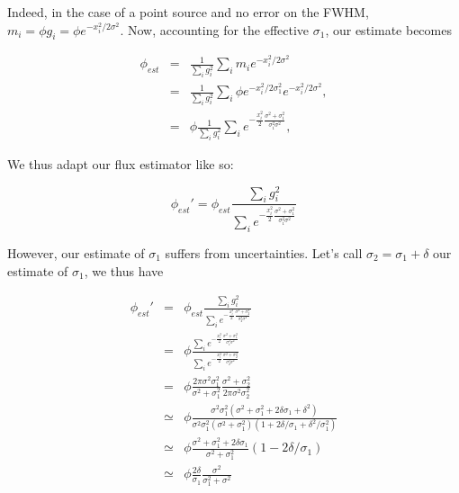 Indeed, in the case of a point source and no error on the FWHM, $m_i = \phi
g_i = \phi e^{-x_i^2/2\sigma^2}$. Now, accounting for the effective $\sigma_1$, our estimate becomes

\begin{eqnarray}
\phi_{est} &=& \frac{1}{\sum_i g_i^2}\sum_i m_ie^{-x_i^2/2\sigma^2} \nonumber\\
&= & \frac{1}{\sum_i g_i^2}\sum_i \phi e^{-x_i^2/2\sigma_1^2} e^{-x_i^2/2\sigma^2}
, \nonumber \\
 &=&\phi\frac{1}{\sum_i g_i^2}\sum_i e^{-\frac{x_i^2}{2}\frac{\sigma^2+\sigma_1^2}{\sigma_1^2\sigma^2}},
\end{eqnarray}

We thus adapt our flux estimator like so:

\begin{equation}
\phi_{est}' = \phi_{est}\frac{\sum_i g_i^2}{\sum_i
  e^{-\frac{x_i^2}{2}\frac{\sigma^2+\sigma_1^2}{\sigma_1^2\sigma^2}}}
\end{equation}

However, our estimate of $\sigma_1$ suffers from uncertainties. Let's call
$\sigma_2 = \sigma_1 + \delta$ our estimate of $\sigma_1$, we thus have

\begin{eqnarray}
\phi_{est}' &=& \phi_{est}\frac{\sum_i g_i^2}{\sum_i
  e^{-\frac{x_i^2}{2}\frac{\sigma^2+\sigma_2^2}{\sigma_2^2\sigma^2}}} \nonumber \\
&=& \phi\frac{\sum_i
  e^{-\frac{x_i^2}{2}\frac{\sigma^2+\sigma_1^2}{\sigma_1^2\sigma^2}}}{\sum_i
  e^{-\frac{x_i^2}{2}\frac{\sigma^2+\sigma_2^2}{\sigma_2^2\sigma^2}}}
\nonumber\\
&=&
\phi\frac{2\pi\sigma^2\sigma_1^2}{\sigma^2+\sigma_1^2}\frac{\sigma^2+\sigma_2^2}{2\pi\sigma^2\sigma_2^2}
\nonumber \\
&\simeq&\phi\frac{\sigma^2\sigma_1^2(\sigma^2+\sigma_1^2+2\delta\sigma_1+\delta^2)}{\sigma^2\sigma_1^2(\sigma^2+\sigma_1^2)(1+2\delta/\sigma_1+
  \delta^2/\sigma_1^2)} \nonumber \\
&\simeq& \phi\frac{\sigma^2+\sigma_1^2+2\delta\sigma_1}{\sigma^2+\sigma_1^2}(1-2\delta/\sigma_1)\nonumber\\
&\simeq& \phi \frac{2\delta}{\sigma_1}\frac{\sigma^2}{\sigma_1^2+\sigma^2}
\end{eqnarray}

